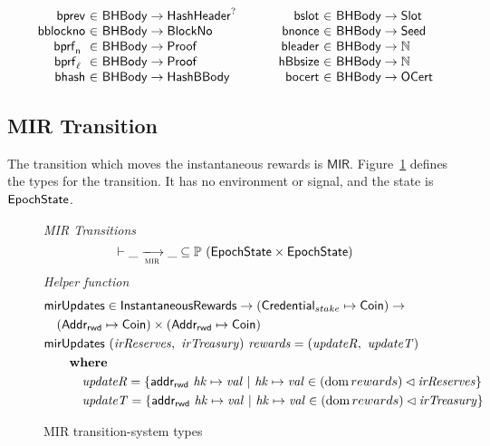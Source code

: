 \begin{figure*}[htb]
\begin{equation*}
\begin{array}{r@{~\in~}l@{~~~~~~~~~~}r@{~\in~}lr}
      \fun{bprev} & \BHBody \to \HashHeader^? &
      \fun{bslot} & \BHBody \to \Slot \\
      \fun{bblockno} & \BHBody \to \BlockNo &
      \fun{bnonce} & \BHBody \to \Seed \\
      \fun{\bprfn{}} & \BHBody \to \Proof &
      \fun{bleader} & \BHBody \to \N \\
      \fun{\bprfl{}} & \BHBody \to \Proof &
      \fun{hBbsize} & \BHBody \to \N \\
      \fun{bhash} & \BHBody \to \HashBBody &
      \fun{bocert} & \BHBody \to \OCert \\
    \end{array}
  \end{equation*}
  \caption{Block Definitions}
  \label{fig:defs:blocks}
\end{figure*}

\clearpage

\subsection{MIR Transition}
\label{sec:mir-trans}

The transition which moves the instantaneous rewards is $\mathsf{MIR}$.
Figure~\ref{fig:ts-types:mir} defines the types for the transition.
It has no environment or signal, and the state is $\mathsf{EpochState}$.

\begin{figure}
  \emph{MIR Transitions}
  \begin{equation*}
    \vdash \var{\_} \trans{mir}{} \var{\_} \subseteq
    \powerset (\EpochState \times \EpochState)
  \end{equation*}
  \emph{Helper function}
  \begin{align*}
      & \mathsf{mirUpdates} \in \mathsf{InstantaneousRewards} \to (\mathsf{Credential}_{stake}\mapsto\mathsf{Coin}) \to \\
      & ~~~(\mathsf{Addr_{rwd}} \mapsto \mathsf{Coin})\times(\mathsf{Addr_{rwd}} \mapsto \mathsf{Coin})
      \\
      & \mathsf{mirUpdates}~(\mathit{irReserves},~\mathit{irTreasury})~\mathit{rewards} =
      (\mathit{updateR},~\mathit{updateT})\\
      & ~~~~~ ~ \mathbf{where}~ ~  \\
      & ~~~~~~~~~\mathit{updateR} =
        \left\{
        \mathsf{addr_{rwd}}~\mathit{hk}\mapsto\mathit{val}
        ~\vert~\mathit{hk}\mapsto\mathit{val}\in(\operatorname{dom}{rewards})\lhd\mathit{irReserves}
        \right\}
        \\
      & ~~~~~~~~~\mathit{updateT} =
        \left\{
        \mathsf{addr_{rwd}}~\mathit{hk}\mapsto\mathit{val}
        ~\vert~\mathit{hk}\mapsto\mathit{val}\in(\operatorname{dom}{rewards})\lhd\mathit{irTreasury}
        \right\}
        \\
  \end{align*}
  \caption{MIR transition-system types}
  \label{fig:ts-types:mir}
\end{figure}


